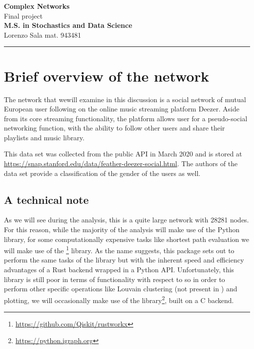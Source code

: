 \documentclass[12pt]{article}
\begin{document}
	\textcolor{UM_Brown}{
		\begin{center}
			\textbf{\Large Complex Networks}\\
			\vspace{5pt}
			Final project \\
			\vspace{5pt}
			\textbf{M.S. in Stochastics and Data Science}\\
			\vspace{20pt}
			Lorenzo Sala mat. 943481\\
			\vspace{5pt}
		\end{center}
		\vspace{10pt}
		\hrule
	}
	
	
	
	
\section{Brief overview of the network}
The network that wewill examine in this discussion is a social network of mutual European user following on the online music streaming platform Deezer. Aside from its core streaming functionality, the platform allows user for a pseudo-social networking function, with the ability to follow other users and share their playlists and music library.\par
This data set was collected from the public API in March 2020 and is stored at \url{https://snap.stanford.edu/data/feather-deezer-social.html}. The authors of the data set provide a classification of the gender of the users as well.
\subsection{A technical note}
As we will see during the analysis, this is a quite large network with 28281 nodes. For this reason, while the majority of the analysis will make use of the Python  library, for some computationally expensive tasks like shortest path evaluation we will make use of the \footnote{\url{https://github.com/Qiskit/rustworkx}} library. As the name suggests, this package sets out to perform the same tasks of the  library but  with the inherent speed and efficiency advantages of a Rust backend wrapped in a Python API. Unfortunately, this library is still poor in terms of functionality with respect to  so in order to perform other specific operations like Louvain clustering (not present in ) and plotting, we will occasionally make use of the  library\footnote{\url{https://python.igraph.org}}, built on a C backend.
\end{document}
